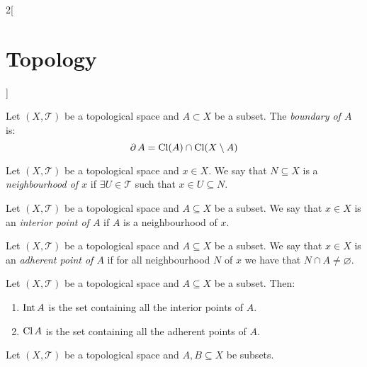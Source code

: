 \documentclass[../../../main.tex]{subfiles}
\begin{document}
\begin{multicols}{2}[\section{Topology}]
\begin{prop}
  \end{prop}
  \begin{definition}
    Let $(X,\mathcal{T})$ be a topological space and $A\subset X$ be a subset. The \textit{boundary of $A$} is: $$\operatorname{\partial} A=\operatorname{Cl}(A)\cap\operatorname{Cl}(X\setminus A)$$
  \end{definition}
  \begin{definition}
    Let $(X,\mathcal{T})$ be a topological space and $x\in X$. We say that $N\subseteq X$ is a \textit{neighbourhood of $x$} if $\exists U\in\mathcal{T}$ such that $x\in U\subseteq N$.
  \end{definition}
  \begin{definition}
    Let $(X,\mathcal{T})$ be a topological space and $A\subseteq X$ be a subset. We say that $x\in X$ is an \textit{interior point of $A$} if $A$ is a neighbourhood of $x$.
  \end{definition}
  \begin{definition}
    Let $(X,\mathcal{T})$ be a topological space and $A\subseteq X$ be a subset. We say that $x\in X$ is an \textit{adherent point of $A$} if for all neighbourhood $N$ of $x$ we have that $N\cap A\ne\varnothing$.
  \end{definition}
  \begin{prop}
    Let $(X,\mathcal{T})$ be a topological space and $A\subseteq X$ be a subset. Then:
    \begin{enumerate}
      \item $\operatorname{Int} A$ is the set containing all the interior points of $A$.
      \item $\operatorname{Cl} A$ is the set containing all the adherent points of $A$.
    \end{enumerate}
  \end{prop}
  \begin{prop}
    Let $(X,\mathcal{T})$ be a topological space and $A,B\subseteq X$ be subsets.


\end{prop}
\end{multicols}
\end{document}
